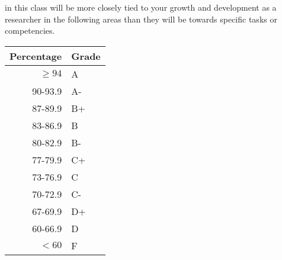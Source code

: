 \documentclass{tufte-handout}
\begin{document}
\begin{fullwidth}
%

\end{fullwidth}


 in this class will be more closely tied to your growth and development as a researcher in the following areas than they will be towards specific tasks or competencies. 

\begin{margintable}
\begin{tabular}{rl}
Percentage & Grade \\
\hline 
$\ge94$ & A \\
90-93.9 & A- \\
87-89.9 & B+ \\
83-86.9 & B \\
80-82.9 & B- \\
77-79.9 & C+ \\
73-76.9 & C \\
70-72.9 & C- \\
67-69.9 & D+ \\
60-66.9 & D \\
$<60$ & F \\
\hline
\end{tabular}
\end{margintable}
\end{document}
